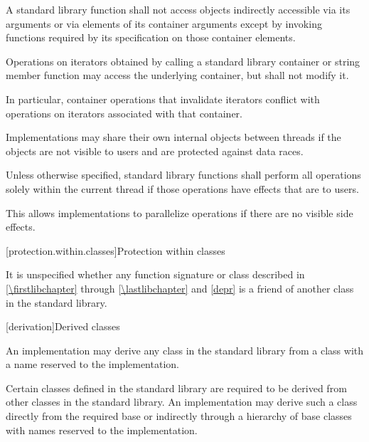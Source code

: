 \pnum
A \Cpp{} standard library function shall not access objects indirectly accessible via its
arguments or via elements of its container arguments except by invoking functions
required by its specification on those container elements.

\pnum
Operations on iterators obtained by calling a standard library container or string
member function may access the underlying container, but shall not modify it.
\begin{note}
In particular, container operations that invalidate iterators conflict
with operations on iterators associated with that container.
\end{note}

\pnum
Implementations may share their own internal objects between threads if the objects are
not visible to users and are protected against data races.

\pnum
Unless otherwise specified, \Cpp{} standard library functions shall perform all operations
solely within the current thread if those operations have effects that are
 to users.

\pnum
\begin{note}
This allows implementations to parallelize operations if there are no visible
%
side effects.
\end{note}

[protection.within.classes]{Protection within classes}

\pnum
{}%
It is unspecified whether any function signature or class described in
\ref{\firstlibchapter} through \ref{\lastlibchapter} and \ref{depr} is a
friend of another class in the \Cpp{} standard library.

[derivation]{Derived classes}

\pnum
{}%
%
An implementation may derive any class in the \Cpp{} standard library from a class with a
name reserved to the implementation.

\pnum
Certain classes defined in the \Cpp{} standard library are required to be derived from
other classes
in the \Cpp{} standard library.
%
An implementation may derive such a class directly from the required base or indirectly
through a hierarchy of base classes with names reserved to the implementation.

